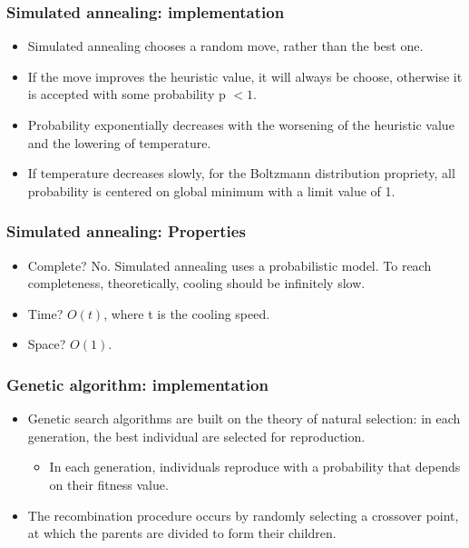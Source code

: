 \documentclass{beamer}
\begin{document}
    \begin{frame}
    \frametitle{Simulated annealing: implementation}
    \begin{itemize}
        \item Simulated annealing chooses a random move, rather than the best one.
        \pause
        \item If the move improves the heuristic value, it will always be choose, otherwise it is accepted with some probability p \begin{math}< 1\end{math}.
        \pause
        \item Probability exponentially decreases with the worsening of the heuristic value and the lowering of temperature.
        \pause
        \item If temperature decreases slowly, for the Boltzmann distribution propriety, all probability is centered on global minimum with a limit value of 1.
    \end{itemize}
    \end{frame}

    \begin{frame}
    \frametitle{Simulated annealing: Properties}
     \begin{itemize}
         \item Complete? \pause No. \pause Simulated annealing uses a probabilistic model. To reach completeness, theoretically,  cooling should be infinitely slow.
         \pause
         \item Time? \pause 
         \begin{math}O(t)\end{math}, where t is the cooling speed.
         \pause
         \item Space? \pause
         \begin{math}O(1).\end{math}
     \end{itemize}   
    \end{frame}

    \begin{frame}
    \frametitle{Genetic algorithm: implementation}
        \begin{itemize}
            \item Genetic search algorithms are built on the theory of natural selection: in each generation, the best individual are selected for reproduction.
            \pause
            \begin{itemize}
                \item In each generation, individuals reproduce with a probability that depends on their fitness value.
            \end{itemize}
            \pause
            \item The recombination procedure occurs by randomly selecting a crossover point, at which the parents are divided to form their children.
        \end{itemize}
    \end{frame}
\end{document}
